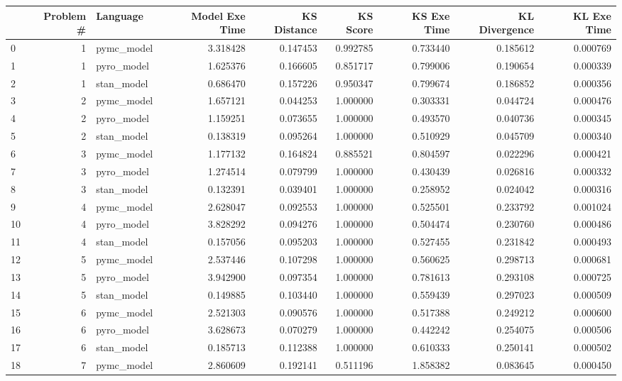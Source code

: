\begin{tabular}{lrlrrrrrr}
\toprule
 & Problem # & Language & Model Exe Time & KS Distance & KS Score & KS Exe Time & KL Divergence & KL Exe Time \\
\midrule
0 & 1 & pymc_model & 3.318428 & 0.147453 & 0.992785 & 0.733440 & 0.185612 & 0.000769 \\
1 & 1 & pyro_model & 1.625376 & 0.166605 & 0.851717 & 0.799006 & 0.190654 & 0.000339 \\
2 & 1 & stan_model & 0.686470 & 0.157226 & 0.950347 & 0.799674 & 0.186852 & 0.000356 \\
3 & 2 & pymc_model & 1.657121 & 0.044253 & 1.000000 & 0.303331 & 0.044724 & 0.000476 \\
4 & 2 & pyro_model & 1.159251 & 0.073655 & 1.000000 & 0.493570 & 0.040736 & 0.000345 \\
5 & 2 & stan_model & 0.138319 & 0.095264 & 1.000000 & 0.510929 & 0.045709 & 0.000340 \\
6 & 3 & pymc_model & 1.177132 & 0.164824 & 0.885521 & 0.804597 & 0.022296 & 0.000421 \\
7 & 3 & pyro_model & 1.274514 & 0.079799 & 1.000000 & 0.430439 & 0.026816 & 0.000332 \\
8 & 3 & stan_model & 0.132391 & 0.039401 & 1.000000 & 0.258952 & 0.024042 & 0.000316 \\
9 & 4 & pymc_model & 2.628047 & 0.092553 & 1.000000 & 0.525501 & 0.233792 & 0.001024 \\
10 & 4 & pyro_model & 3.828292 & 0.094276 & 1.000000 & 0.504474 & 0.230760 & 0.000486 \\
11 & 4 & stan_model & 0.157056 & 0.095203 & 1.000000 & 0.527455 & 0.231842 & 0.000493 \\
12 & 5 & pymc_model & 2.537446 & 0.107298 & 1.000000 & 0.560625 & 0.298713 & 0.000681 \\
13 & 5 & pyro_model & 3.942900 & 0.097354 & 1.000000 & 0.781613 & 0.293108 & 0.000725 \\
14 & 5 & stan_model & 0.149885 & 0.103440 & 1.000000 & 0.559439 & 0.297023 & 0.000509 \\
15 & 6 & pymc_model & 2.521303 & 0.090576 & 1.000000 & 0.517388 & 0.249212 & 0.000600 \\
16 & 6 & pyro_model & 3.628673 & 0.070279 & 1.000000 & 0.442242 & 0.254075 & 0.000506 \\
17 & 6 & stan_model & 0.185713 & 0.112388 & 1.000000 & 0.610333 & 0.250141 & 0.000502 \\
18 & 7 & pymc_model & 2.860609 & 0.192141 & 0.511196 & 1.858382 & 0.083645 & 0.000450 \\

\end{tabular}
